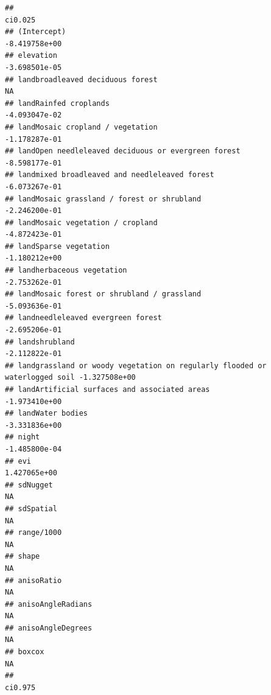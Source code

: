 \documentclass[
]{article}
\begin{document}
\begin{verbatim}
##                                                                                  ci0.025
## (Intercept)                                                                -8.419758e+00
## elevation                                                                  -3.698501e-05
## landbroadleaved deciduous forest                                                      NA
## landRainfed croplands                                                      -4.093047e-02
## landMosaic cropland / vegetation                                           -1.178287e-01
## landOpen needleleaved deciduous or evergreen forest                        -8.598177e-01
## landmixed broadleaved and needleleaved forest                              -6.073267e-01
## landMosaic grassland / forest or shrubland                                 -2.246200e-01
## landMosaic vegetation / cropland                                           -4.872423e-01
## landSparse vegetation                                                      -1.180212e+00
## landherbaceous vegetation                                                  -2.753262e-01
## landMosaic forest or shrubland / grassland                                 -5.093636e-01
## landneedleleaved evergreen forest                                          -2.695206e-01
## landshrubland                                                              -2.112822e-01
## landgrassland or woody vegetation on regularly flooded or waterlogged soil -1.327508e+00
## landArtificial surfaces and associated areas                               -1.973410e+00
## landWater bodies                                                           -3.331836e+00
## night                                                                      -1.485800e-04
## evi                                                                         1.427065e+00
## sdNugget                                                                              NA
## sdSpatial                                                                             NA
## range/1000                                                                            NA
## shape                                                                                 NA
## anisoRatio                                                                            NA
## anisoAngleRadians                                                                     NA
## anisoAngleDegrees                                                                     NA
## boxcox                                                                                NA
##                                                                                  ci0.975

\end{verbatim}
\end{document}
